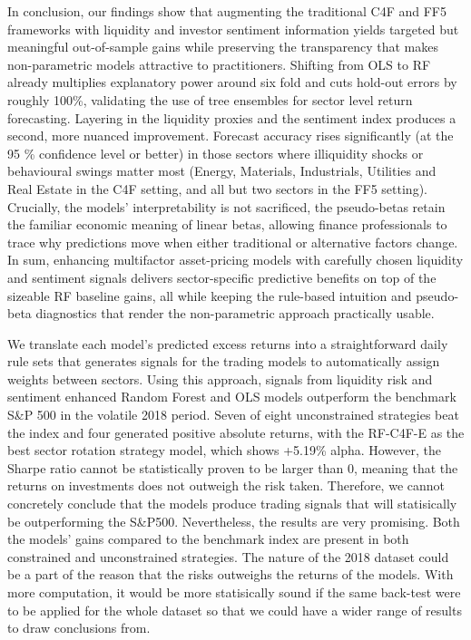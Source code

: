 
In conclusion, our findings show that augmenting the traditional C4F and FF5 frameworks with liquidity and investor sentiment information yields targeted but meaningful out-of-sample gains while preserving the transparency that makes non-parametric models attractive to practitioners. Shifting from OLS to RF already multiplies explanatory power around six fold and cuts hold-out errors by roughly 100\%, validating the use of tree ensembles for sector level return forecasting. Layering in the liquidity proxies and the sentiment index produces a second, more nuanced improvement. Forecast accuracy rises significantly (at the 95 \% confidence level or better) in those sectors where illiquidity shocks or behavioural swings matter most (Energy, Materials, Industrials, Utilities and Real Estate in the C4F setting, and all but two sectors in the FF5 setting). Crucially, the models' interpretability is not sacrificed, the pseudo-betas retain the familiar economic meaning of linear betas, allowing finance professionals to trace why predictions move when either traditional or alternative factors change. In sum, enhancing multifactor asset-pricing models with carefully chosen liquidity and sentiment signals delivers sector-specific predictive benefits on top of the sizeable RF baseline gains, all while keeping the rule-based intuition and pseudo-beta diagnostics that render the non-parametric approach practically usable.

We translate each model's predicted excess returns into a straightforward daily rule sets that generates signals for the trading models to automatically assign weights between sectors. Using this approach, signals from liquidity risk and sentiment enhanced Random Forest and OLS models outperform the benchmark S\&P 500 in the volatile 2018 period.  Seven of eight unconstrained strategies beat the index and four generated positive absolute returns, with the RF-C4F-E as the best sector rotation strategy model, which shows +5.19\% alpha. However, the Sharpe ratio cannot be statistically proven to be larger than 0, meaning that the returns on investments does not outweigh the risk taken. Therefore, we cannot concretely conclude that the models produce trading signals that will statisically be outperforming the S\&P500. Nevertheless, the results are very promising. Both the models' gains compared to the benchmark index are present in both constrained and unconstrained strategies. The nature of the 2018 dataset could be a part of the reason that the risks outweighs the returns of the models. With more computation, it would be more statisically sound if the same back-test were to be applied for the whole dataset so that we could have a wider range of results to draw conclusions from.
